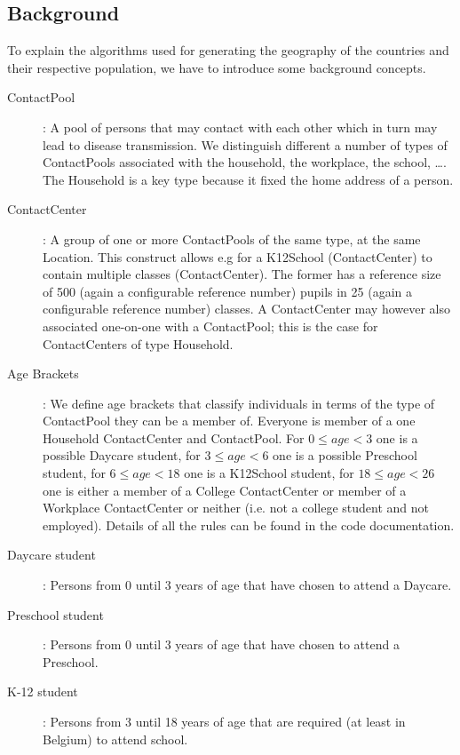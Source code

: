 \subsection{Background}
\label{subsection:background}

To explain the algorithms used for generating the geography of the countries and their respective population, we have to introduce some background concepts. 

\begin{description}
    \item[ContactPool]:
        A pool of persons that may contact with each other which in turn may lead to disease transmission.
        We distinguish different a number of types of ContactPools associated with the household, the workplace, 
        the school, \ldots. The Household is a key type because it fixed the home address of a person.
    \item[ContactCenter]:
        A group of one or more ContactPools of the same type, at the same Location.
        This construct allows e.g for a K12School (ContactCenter) to contain multiple classes (ContactCenter). 
        The former has a reference size of 500 (again a configurable reference number) pupils in 25 
        (again a configurable reference number) classes.
        A ContactCenter may however also associated one-on-one with a ContactPool; this is the case for 
        ContactCenters of type  Household.
\item[Age Brackets]: 
    		We define age brackets that classify individuals in terms of the type of ContactPool they 
    		can be a member of. Everyone is member of a one Household ContactCenter and ContactPool. For $0 \leqslant age < 3$ one is a possible Daycare student, for $3 \leqslant age < 6$ one is a possible Preschool student, for  $6 \leqslant age < 18$ one is a K12School student, for $18 \leqslant age < 26$ one is either a member of a College
    		ContactCenter or member of a Workplace ContactCenter or neither (i.e. not a college student and not
    		employed). Details of all the rules can be found in the code documentation.
    \item[Daycare student]: 
    		Persons from 0 until 3 years of age that have chosen to attend a Daycare. 
    \item[Preschool student]: 
    		Persons from 0 until 3 years of age that have chosen to attend a Preschool. 		
    \item[K-12 student]: 
    		Persons from 3 until 18 years of age that are required (at least in Belgium) to attend school. 

\end{description}
